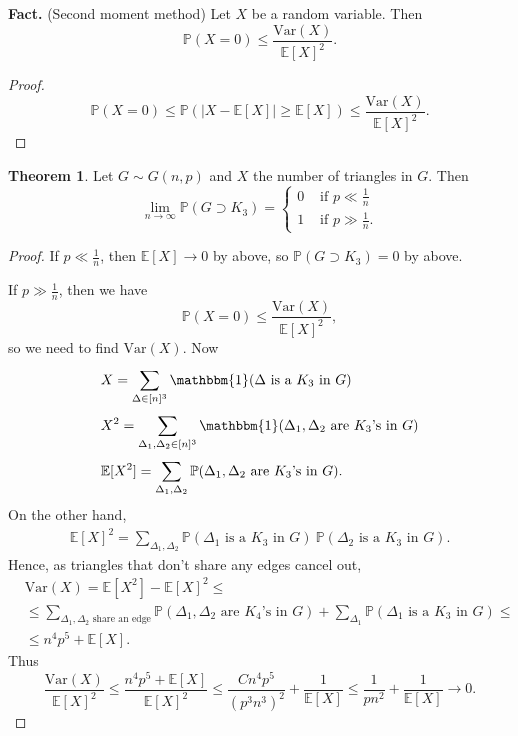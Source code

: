 \documentclass{article}
\theoremstyle{definition}
\newtheorem{theorem}{Theorem}[section]
\begin{document}
\textbf{Fact.} (Second moment method) Let $X$ be a random variable. Then \[
\mathbb{P}(X = 0) \le \frac{\text{Var}(X)}{\mathbb{E}[X]^2}.
\] 
\begin{proof}
    \[
    \mathbb{P}(X = 0) \le \mathbb{P}(|X - \mathbb{E}[X]| \ge \mathbb{E}[X]) \le \frac{\text{Var}(X)}{\mathbb{E}[X]^2}.
    \]
\end{proof}
\begin{theorem}
    Let $G \sim G(n,p)$ and $X$ the number of triangles in $G$. Then \[
    \lim_{n \to \infty} \mathbb{P}(G \supset K_3) = \begin{cases}
        0 &\text{ if } p \ll \frac{1}{n}\\
        1 &\text{ if } p \gg \frac{1}{n}.
    \end{cases}
    \]
\end{theorem}
\begin{proof}
    If $p \ll \frac{1}{n}$, then $\mathbb{E}[X] \to 0$ by above, so $\mathbb{P}(G \supset K_3) = 0$ by above.
    \vspace{1mm}
    
    If $p \gg \frac{1}{n}$, then we have \[
    \mathbb{P}(X=0)\le \frac{\text{Var}(X)}{\mathbb{E}[X]^2},
    \]
    so we need to find $\text{Var}(X)$. Now 
    \begin{align*}
    &X = \sum_{\Delta \in [n]^3}^{} \mathbbm{1}(\Delta \text{ is a }K_3 \text{ in }G) \\
    &X^2 = \sum_{\Delta_1,\Delta_2 \in [n]^3}^{} \mathbbm{1}(\Delta_1,\Delta_2 \text{ are }K_3\text{'s in }G) \\
    &\mathbb{E}[X^2] = \sum_{\Delta_1,\Delta_2}^{} \mathbb{P}(\Delta_1,\Delta_2 \text{ are }K_3 \text{'s in }G).
    \end{align*}
    On the other hand, 
    \begin{align*}
        \mathbb{E}[X]^2 = \sum_{\Delta_1,\Delta_2}^{} \mathbb{P}(\Delta_1 \text{ is a }K_3 \text{ in }G) ~ \mathbb{P}(\Delta_2 \text{ is a }K_3 \text{ in }G).
    \end{align*}
    Hence, as triangles that don't share any edges cancel out,
    \begin{align*}
        &\text{Var}(X) = \mathbb{E}[X^2] - \mathbb{E}[X]^2 \le \\
        &\le \sum_{\Delta_1,\Delta_2 \text{ share an edge}}^{} \mathbb{P}(\Delta_1,\Delta_2 \text{ are }K_4\text{'s in }G) + \sum_{\Delta_1}^{} \mathbb{P}(\Delta_1 \text{ is a }K_3 \text{ in }G) \le \\
        &\le n^4 p^5 + \mathbb{E}[X].
    \end{align*}
    Thus \[
    \frac{\text{Var}(X)}{\mathbb{E}[X]^2} \le \frac{n^4 p^5 + \mathbb{E}[X]}{\mathbb{E}[X]^2} \le \frac{C n^4 p^5}{(p^3n^3)^2} + \frac{1}{\mathbb{E}[X]} \le \frac{1}{pn^2} + \frac{1}{\mathbb{E}[X]} \to 0.
    \]
\end{proof}
\end{document}
